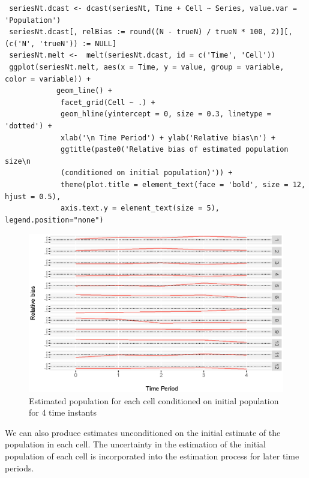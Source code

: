 \documentclass[12pt, a4paper]{article}
\begin{document}
 
 \begin{verbatim}
 seriesNt.dcast <- dcast(seriesNt, Time + Cell ~ Series, value.var = 'Population')
 seriesNt.dcast[, relBias := round((N - trueN) / trueN * 100, 2)][, (c('N', 'trueN')) := NULL]
 seriesNt.melt <-  melt(seriesNt.dcast, id = c('Time', 'Cell'))
 ggplot(seriesNt.melt, aes(x = Time, y = value, group = variable, color = variable)) + 
            geom_line() + 
             facet_grid(Cell ~ .) +
             geom_hline(yintercept = 0, size = 0.3, linetype = 'dotted') + 
             xlab('\n Time Period') + ylab('Relative bias\n') +
             ggtitle(paste0('Relative bias of estimated population size\n 
             (conditioned on initial population)')) +
             theme(plot.title = element_text(face = 'bold', size = 12, hjust = 0.5), 
             axis.text.y = element_text(size = 5), legend.position="none")
 \end{verbatim}
 
\begin{figure}
	\centering
	\includegraphics[scale=0.85]{time4.eps}
	\caption{Estimated population for each cell conditioned on initial population for 4 time instants}
	\label{time4} 	
\end{figure}
 
We can also produce estimates unconditioned on the initial estimate of the population in each cell. 
The uncertainty in the estimation of the initial population of each cell is incorporated into the estimation 
process for later time periods.
 
\end{document}
